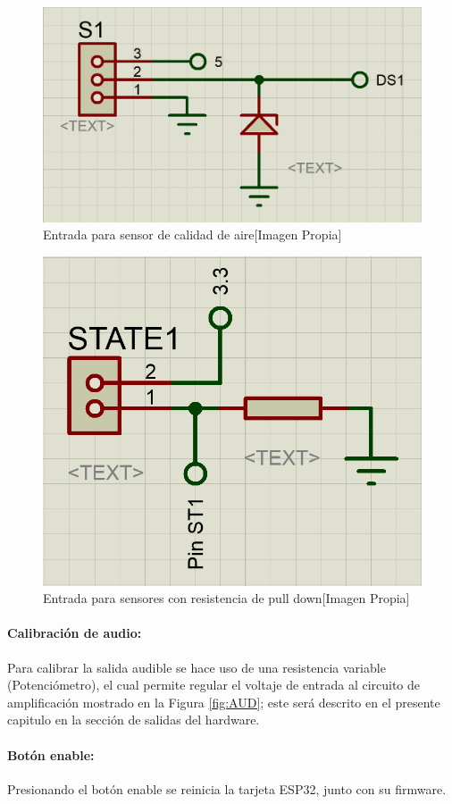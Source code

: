 		\begin{figure}[H]
			\centering
			\caption{Entrada para sensor de calidad de aire[Imagen Propia]}
			\label{fig:S1Aire}
			\includegraphics[width=0.6\linewidth]{Imagenes/S1Aire}
		\end{figure}
	
		\begin{figure}[H]
			\centering
			\caption{Entrada para sensores con resistencia de pull down[Imagen Propia]}
			\label{fig:ST}
			\includegraphics[width=0.5\linewidth]{Imagenes/ST}
		\end{figure}		
	
	\paragraph{Calibración de audio:}
		Para calibrar la salida audible se hace uso de una resistencia variable (Potenciómetro), el cual permite regular el voltaje de entrada al circuito de amplificación mostrado en la Figura \ref{fig:AUD}; este será descrito en el presente capitulo en la sección de salidas del hardware.\\ 
		
	\paragraph{Botón enable:}
		Presionando el botón enable se reinicia la tarjeta ESP32, junto con su firmware.\\
		
